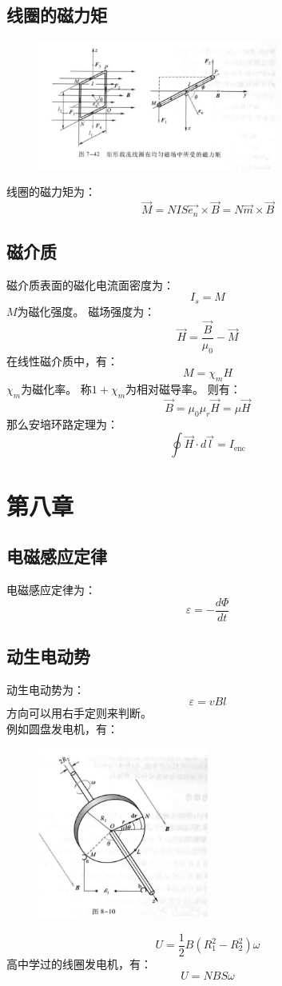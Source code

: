 \documentclass{ctexart}
\begin{document}
\subsection{线圈的磁力矩}
\begin{figure}[H]
    \centering
    \includegraphics[width=0.7\textwidth]{img/7-42.jpg}
\end{figure}
线圈的磁力矩为：
$$
    \vec{M} =NIS\vec{e_n}\times \vec{B}=N \vec{m} \times \vec{B}
$$
\subsection{磁介质}
磁介质表面的磁化电流面密度为：
$$
    I_s = M
$$
$M$为磁化强度。
磁场强度为：
$$
    \vec{H} = \frac{\vec{B}}{\mu_0} - \vec{M}
$$
在线性磁介质中，有：
$$
    M = \chi_m H
$$
$\chi_m$为磁化率。
称$1+\chi_m$为相对磁导率。
则有：
$$
    \vec{B} = \mu_0\mu_r \vec{H} = \mu \vec{H}
$$
那么安培环路定理为：
$$
    \oint \vec{H} \cdot d\vec{l} = I_{\text{enc}}
$$
\section{第八章}
\subsection{电磁感应定律}
电磁感应定律为：
$$
    \varepsilon = -\frac{d\Phi}{dt}
$$
\subsection{动生电动势}
动生电动势为：
$$
    \varepsilon = vBl
$$
方向可以用右手定则来判断。\\
例如圆盘发电机，有：
\begin{figure}[H]
    \centering
    \includegraphics[width=0.5\textwidth]{img/8-10.jpg}
\end{figure}
$$
    U = \frac{1}{2} B (R_1^2 - R_2^2) \omega
$$
高中学过的线圈发电机，有：
$$
    U = NBS\omega
$$
\end{document}
